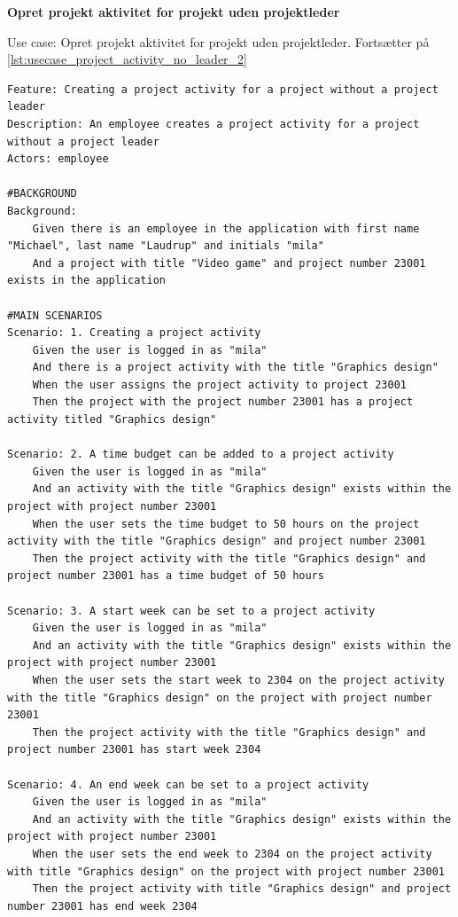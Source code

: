 \textbf{Opret projekt aktivitet for projekt uden projektleder}
\begin{listing}[H]
    \centering
    \caption{Use case: Opret projekt aktivitet for projekt uden projektleder. Fortsætter på \cref{lst:usecase_project_activity_no_leader_2}} \label{lst:usecase_project_activity_no_leader}
    \begin{verbatim}  
Feature: Creating a project activity for a project without a project leader
Description: An employee creates a project activity for a project without a project leader
Actors: employee

#BACKGROUND
Background:
    Given there is an employee in the application with first name "Michael", last name "Laudrup" and initials "mila"
    And a project with title "Video game" and project number 23001 exists in the application

#MAIN SCENARIOS
Scenario: 1. Creating a project activity
    Given the user is logged in as "mila"
    And there is a project activity with the title "Graphics design"  
    When the user assigns the project activity to project 23001 
    Then the project with the project number 23001 has a project activity titled "Graphics design" 

Scenario: 2. A time budget can be added to a project activity
    Given the user is logged in as "mila"
    And an activity with the title "Graphics design" exists within the project with project number 23001
    When the user sets the time budget to 50 hours on the project activity with the title "Graphics design" and project number 23001
    Then the project activity with the title "Graphics design" and project number 23001 has a time budget of 50 hours 

Scenario: 3. A start week can be set to a project activity
    Given the user is logged in as "mila"
    And an activity with the title "Graphics design" exists within the project with project number 23001
    When the user sets the start week to 2304 on the project activity with the title "Graphics design" on the project with project number 23001
    Then the project activity with the title "Graphics design" and project number 23001 has start week 2304

Scenario: 4. An end week can be set to a project activity
    Given the user is logged in as "mila"
    And an activity with the title "Graphics design" exists within the project with project number 23001
    When the user sets the end week to 2304 on the project activity with title "Graphics design" on the project with project number 23001
    Then the project activity with title "Graphics design" and project number 23001 has end week 2304
    \end{verbatim}
\end{listing}
